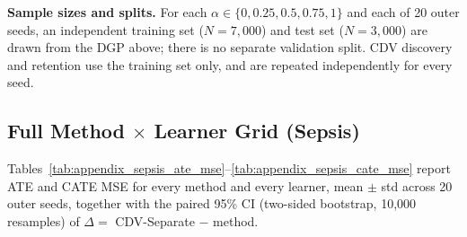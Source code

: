 \documentclass[manuscript,review,natbib=false]{acmart}
\begin{document}
\noindent\textbf{Sample sizes and splits.} For each $\alpha\in\{0,0.25,0.5,0.75,1\}$ and each of 20 outer seeds, an independent training set ($N=7{,}000$) and test set ($N=3{,}000$) are drawn from the DGP above; there is no separate validation split. CDV discovery and retention use the training set only, and are repeated independently for every seed.

\subsection{Full Method \texorpdfstring{$\times$}{x} Learner Grid (Sepsis)}
Tables~\ref{tab:appendix_sepsis_ate_mse}--\ref{tab:appendix_sepsis_cate_mse} report ATE and CATE MSE for every method and every learner, mean $\pm$ std across 20 outer seeds, together with the paired 95\% CI (two-sided bootstrap, 10{,}000 resamples) of $\Delta=$ CDV-Separate $-$ method.

\begin{table}[htbp]
\tiny
\centering
\caption{Sepsis: full method $\times$ learner grid, ATE MSE. Values are reported in millions ($\times 10^6$) as mean $\pm$ std across 20 outer seeds; brackets give the paired 95\% CI of $\Delta=$ CDV-Separate $-$ method (two-sided bootstrap).}
\label{tab:appendix_sepsis_ate_mse}
\end{table}
\end{document}
